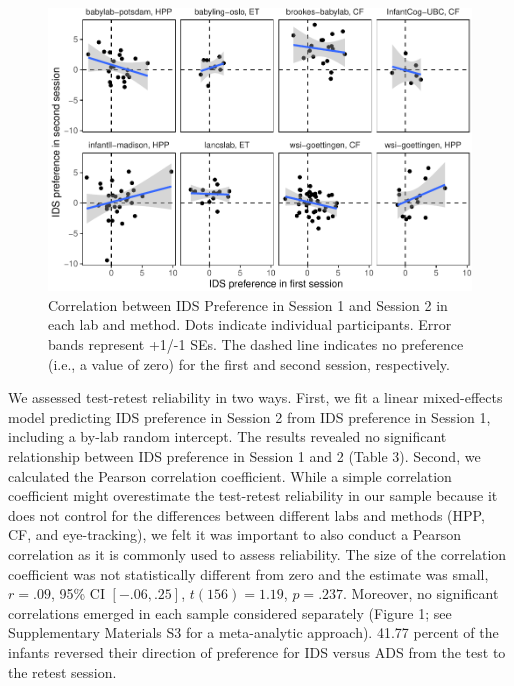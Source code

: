 \documentclass[
  man,floatsintext]{apa6}
\begin{document}
\begin{figure}

{\centering \includegraphics{Retest_current_draft_files/figure-latex/unnamed-chunk-5-1} 

}

\caption{Correlation between IDS Preference in Session 1 and Session 2 in each lab and method. Dots indicate individual participants. Error bands represent +1/-1 SEs. The dashed line indicates no preference (i.e., a value of zero) for the first and second session, respectively.}\label{fig:unnamed-chunk-5}
\end{figure}

We assessed test-retest reliability in two ways.
First, we fit a linear mixed-effects model predicting IDS preference in Session 2 from IDS preference in Session 1, including a by-lab random intercept.
The results revealed no significant relationship between IDS preference in Session 1 and 2 (Table 3).
Second, we calculated the Pearson correlation coefficient.
While a simple correlation coefficient might overestimate the test-retest reliability in our sample because it does not control for the differences between different labs and methods (HPP, CF, and eye-tracking), we felt it was important to also conduct a Pearson correlation as it is commonly used to assess reliability.
The size of the correlation coefficient was not statistically different from zero and the estimate was small, \(r = .09\), 95\% CI \([-.06, .25]\), \(t(156) = 1.19\), \(p = .237\).
Moreover, no significant correlations emerged in each sample considered separately (Figure 1; see Supplementary Materials S3 for a meta-analytic approach).
41.77 percent of the infants reversed their direction of preference for IDS versus ADS from the test to the retest session.
\end{document}
